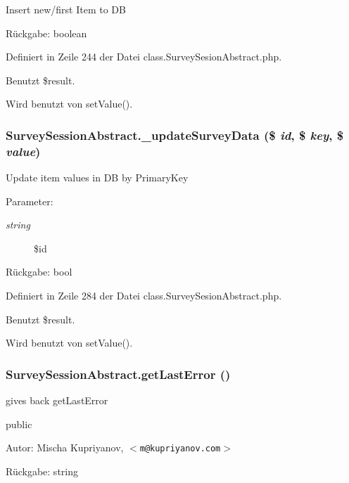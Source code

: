 Insert new/first Item to DB

\begin{Desc}
\item[Rückgabe:]boolean \end{Desc}


Definiert in Zeile 244 der Datei class.SurveySesionAbstract.php.

Benutzt \$result.

Wird benutzt von setValue().
\subsubsection{\setlength{\rightskip}{0pt plus 5cm}SurveySessionAbstract.\_\-updateSurveyData (\$ {\em id}, \$ {\em key}, \$ {\em value})}\label{classSurveySessionAbstract_ba05089f3e12573b359be503b26e72d9}


Update item values in DB by PrimaryKey

\begin{Desc}
\item[Parameter:]
\begin{description}
\item[{\em string}]\$id \end{description}
\end{Desc}
\begin{Desc}
\item[Rückgabe:]bool \end{Desc}


Definiert in Zeile 284 der Datei class.SurveySesionAbstract.php.

Benutzt \$result.

Wird benutzt von setValue().
\subsubsection{\setlength{\rightskip}{0pt plus 5cm}SurveySessionAbstract.getLastError ()}\label{classSurveySessionAbstract_157558112404914b1bdcf1f156232144}


gives back getLastError

public \begin{Desc}
\item[Autor:]Mischa Kupriyanov, $<${\tt m@kupriyanov.com}$>$ \end{Desc}
\begin{Desc}
\item[Rückgabe:]string \end{Desc}


